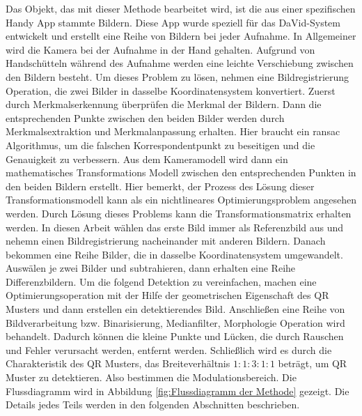 Das Objekt, das mit dieser Methode bearbeitet wird, ist die aus einer spezifischen Handy App stammte Bildern. Diese App wurde speziell für das DaVid-System entwickelt und erstellt eine Reihe von Bildern bei jeder Aufnahme. In Allgemeiner wird die Kamera bei der Aufnahme in der Hand gehalten. Aufgrund von Handschütteln während des Aufnahme werden eine leichte Verschiebung zwischen den Bildern besteht. Um dieses Problem zu lösen, nehmen eine Bildregistrierung Operation, die zwei Bilder in dasselbe Koordinatensystem konvertiert. Zuerst durch Merkmalserkennung überprüfen die Merkmal der Bildern. Dann die entsprechenden Punkte zwischen den beiden Bilder werden durch Merkmalsextraktion und Merkmalanpassung erhalten. Hier braucht ein \gls{ransac} Algorithmus, um die falschen Korrespondentpunkt zu beseitigen und die Genauigkeit zu verbessern. Aus dem Kameramodell wird dann ein mathematisches Transformations Modell zwischen den entsprechenden Punkten in den beiden Bildern erstellt. Hier bemerkt, der Prozess des Lösung dieser Transformationsmodell kann als ein nichtlineares Optimierungsproblem angesehen werden. Durch Lösung dieses Problems kann die Transformationsmatrix erhalten werden. In diesen Arbeit wählen das erste Bild immer als Referenzbild aus und nehemn einen Bildregistrierung nacheinander mit anderen Bildern. Danach bekommen eine Reihe Bilder, die in dasselbe Koordinatensystem umgewandelt. Auswälen je zwei Bilder und subtrahieren, dann erhalten eine Reihe Differenzbildern. Um die folgend Detektion zu vereinfachen, machen eine Optimierungsoperation mit der Hilfe der geometrischen Eigenschaft des QR Musters und dann erstellen ein detektierendes Bild. Anschließen eine Reihe von Bildverarbeitung bzw. Binarisierung, Medianfilter, Morphologie Operation wird behandelt. Dadurch können die kleine Punkte und Lücken, die durch Rauschen und Fehler verursacht werden, entfernt werden. Schließlich wird es durch die Charakteristik des QR Musters, das Breiteverhältnis $1:1:3:1:1$ beträgt, um QR Muster zu detektieren. Also bestimmen die Modulationsbereich. Die Flussdiagramm wird in Abbildung \ref{fig:Flussdiagramm der Methode} gezeigt. Die Details jedes Teils werden in den folgenden Abschnitten beschrieben.

